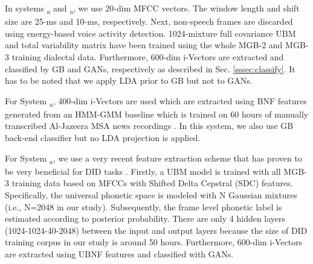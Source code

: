 \documentclass{article}
\begin{document}
In systems \textsubscript{a} and \textsubscript{a}, we use 20-dim MFCC vectors. The window length and shift size are 25-ms and 10-ms, respectively. Next, non-speech frames are discarded using energy-based voice activity detection. 1024-mixture full covariance UBM and total variability matrix have been trained using the whole MGB-2 and MGB-3 training dialectal data. Furthermore, 600-dim i-Vectors are extracted and classified by GB and GANs, respectively as described in Sec. \ref{sssec:classify}. It has to be noted that we apply LDA prior to GB but not to GANs.

For System \textsubscript{a}, 400-dim i-Vectors are used which are extracted using BNF features generated from an HMM-GMM baseline which is trained on 60 hours of manually transcribed Al-Jazeera MSA news recordings \cite{ali2016mgb}. In this system, we also use GB back-end classifier but no LDA projection is applied.

For System \textsubscript{a}, we use a very recent feature extraction scheme that has proven to be very beneficial for DID tasks \cite{zhang2017ubnf}. Firstly, a UBM model is trained with all MGB-3 training data based on MFCCs with Shifted Delta Cepstral (SDC) features. Specifically, the universal phonetic space is modeled with N Gaussian mixtures (i.e., N=2048 in our study). Subsequently, the frame level phonetic label is estimated according to posterior probability. There are only 4 hidden layers (1024-1024-40-2048) between the input and output layers because the size of DID training corpus in our study is around 50 hours. Furthermore, 600-dim i-Vectors are extracted using UBNF features and classified with GANs.




\end{document}
